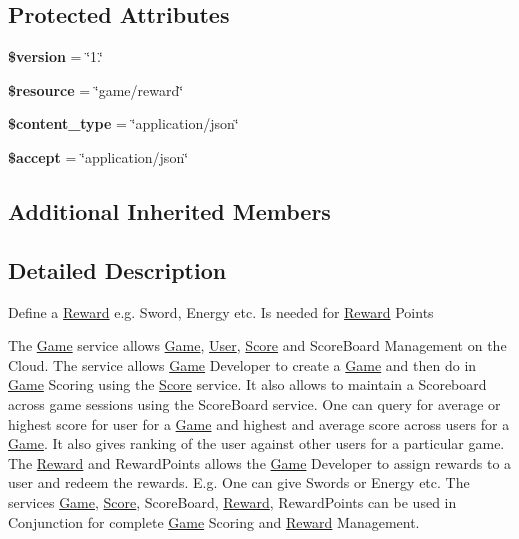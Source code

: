 \subsection*{Protected Attributes}
\begin{DoxyCompactItemize}
\item 
\hypertarget{class_reward_service_a17c8948c68aa44fa9961ae169b6a8961}{{\bfseries \$version} = \char`\"{}1.\char`\"{}}\label{class_reward_service_a17c8948c68aa44fa9961ae169b6a8961}

\item 
\hypertarget{class_reward_service_abd4c7b8b084214b8d2533ba07fce6b83}{{\bfseries \$resource} = \char`\"{}game/reward\char`\"{}}\label{class_reward_service_abd4c7b8b084214b8d2533ba07fce6b83}

\item 
\hypertarget{class_reward_service_ae754d6373f275e781f47c8bc9b994b6d}{{\bfseries \$content\+\_\+type} = \char`\"{}application/json\char`\"{}}\label{class_reward_service_ae754d6373f275e781f47c8bc9b994b6d}

\item 
\hypertarget{class_reward_service_a75fc18c4ff06288ff9fdf8aba9bd1081}{{\bfseries \$accept} = \char`\"{}application/json\char`\"{}}\label{class_reward_service_a75fc18c4ff06288ff9fdf8aba9bd1081}

\end{DoxyCompactItemize}
\subsection*{Additional Inherited Members}


\subsection{Detailed Description}
Define a \hyperlink{class_reward}{Reward} e.\+g. Sword, Energy etc. Is needed for \hyperlink{class_reward}{Reward} Points

The \hyperlink{class_game}{Game} service allows \hyperlink{class_game}{Game}, \hyperlink{class_user}{User}, \hyperlink{class_score}{Score} and Score\+Board Management on the Cloud. The service allows \hyperlink{class_game}{Game} Developer to create a \hyperlink{class_game}{Game} and then do in \hyperlink{class_game}{Game} Scoring using the \hyperlink{class_score}{Score} service. It also allows to maintain a Scoreboard across game sessions using the Score\+Board service. One can query for average or highest score for user for a \hyperlink{class_game}{Game} and highest and average score across users for a \hyperlink{class_game}{Game}. It also gives ranking of the user against other users for a particular game. The \hyperlink{class_reward}{Reward} and Reward\+Points allows the \hyperlink{class_game}{Game} Developer to assign rewards to a user and redeem the rewards. E.\+g. One can give Swords or Energy etc. The services \hyperlink{class_game}{Game}, \hyperlink{class_score}{Score}, Score\+Board, \hyperlink{class_reward}{Reward}, Reward\+Points can be used in Conjunction for complete \hyperlink{class_game}{Game} Scoring and \hyperlink{class_reward}{Reward} Management.

